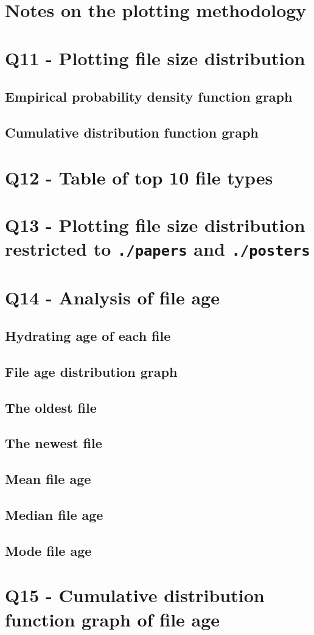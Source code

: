 \documentclass{article}
\begin{document}
\section*{Notes on the plotting methodology}

\section*{Q11 - Plotting file size distribution}
\subsection*{Empirical probability density function graph}
\subsection*{Cumulative distribution function graph}
\section*{Q12 - Table of top 10 file types}
\section*{Q13 - Plotting file size distribution restricted to \texttt{./papers} and \texttt{./posters}}
\section*{Q14 - Analysis of file age}
\subsection*{Hydrating age of each file}
\subsection*{File age distribution graph}
\subsection*{The oldest file}
\subsection*{The newest file}
\subsection*{Mean file age}
\subsection*{Median file age}
\subsection*{Mode file age}
\section*{Q15 - Cumulative distribution function graph of file age}

\newpage
\printbibliography
\end{document}
